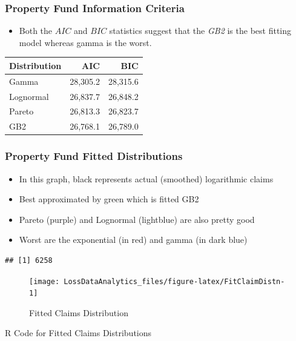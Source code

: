 \documentclass[]{book}
\providecommand{\tightlist}{%
  \setlength{\itemsep}{0pt}\setlength{\parskip}{0pt}}
\begin{document}
\subsubsection{Property Fund Information
Criteria}\label{property-fund-information-criteria}

\begin{itemize}
\tightlist
\item
  Both the \(AIC\) and \(BIC\) statistics suggest that the \emph{GB2} is
  the best fitting model whereas gamma is the worst.
\end{itemize}

\begin{longtable}[]{@{}lrr@{}}
\toprule
Distribution & AIC & BIC\tabularnewline
\midrule
\endhead
Gamma & 28,305.2 & 28,315.6\tabularnewline
Lognormal & 26,837.7 & 26,848.2\tabularnewline
Pareto & 26,813.3 & 26,823.7\tabularnewline
GB2 & 26,768.1 & 26,789.0\tabularnewline
\bottomrule
\end{longtable}

\subsubsection{Property Fund Fitted
Distributions}\label{property-fund-fitted-distributions}

\begin{itemize}
\item
  In this graph, black represents actual (smoothed) logarithmic claims
\item
  Best approximated by green which is fitted GB2
\item
  Pareto (purple) and Lognormal (lightblue) are also pretty good
\item
  Worst are the exponential (in red) and gamma (in dark blue)
\end{itemize}

\begin{verbatim}
## [1] 6258
\end{verbatim}

\begin{figure}

{\centering \texttt{[image: LossDataAnalytics\_files/figure-latex/FitClaimDistn-1]} 

}

\caption{Fitted Claims Distribution}\label{fig:FitClaimDistn}
\end{figure}

R Code for Fitted Claims Distributions
\end{document}
